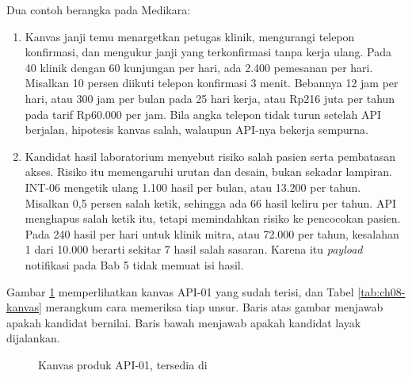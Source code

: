 Dua contoh berangka pada Medikara:
\begin{enumerate}
  \item Kanvas janji temu menargetkan petugas klinik, mengurangi telepon konfirmasi, dan mengukur janji yang terkonfirmasi tanpa
        kerja ulang. Pada 40 klinik dengan 60 kunjungan per hari, ada 2.400 pemesanan per hari. Misalkan 10 persen diikuti
        telepon konfirmasi 3 menit. Bebannya 12 jam per hari, atau 300 jam per bulan pada 25 hari kerja, atau Rp216 juta per
        tahun pada tarif Rp60.000 per jam. Bila angka telepon tidak turun setelah API berjalan, hipotesis kanvas salah, walaupun
        API-nya bekerja sempurna.
  \item Kandidat hasil laboratorium menyebut risiko salah pasien serta pembatasan akses. Risiko itu memengaruhi urutan dan desain,
        bukan sekadar lampiran. INT-06 mengetik ulang 1.100 hasil per bulan, atau 13.200 per tahun. Misalkan 0,5 persen salah
        ketik, sehingga ada 66 hasil keliru per tahun. API menghapus salah ketik itu, tetapi memindahkan risiko ke pencocokan
        pasien. Pada 240 hasil per hari untuk klinik mitra, atau 72.000 per tahun, kesalahan 1 dari 10.000 berarti sekitar 7
        hasil salah sasaran. Karena itu \textit{payload} notifikasi pada Bab 5 tidak memuat isi hasil.
\end{enumerate}

Gambar \ref{fig:ch08-kanvas} memperlihatkan kanvas API-01 yang sudah terisi, dan Tabel \ref{tab:ch08-kanvas} merangkum cara memeriksa
tiap unsur. Baris atas gambar menjawab apakah kandidat bernilai. Baris bawah menjawab apakah kandidat layak dijalankan.

\begin{figure}[!htb]
  \centering
  
  \caption{Kanvas produk API-01, tersedia di }
  \label{fig:ch08-kanvas}
\end{figure}


